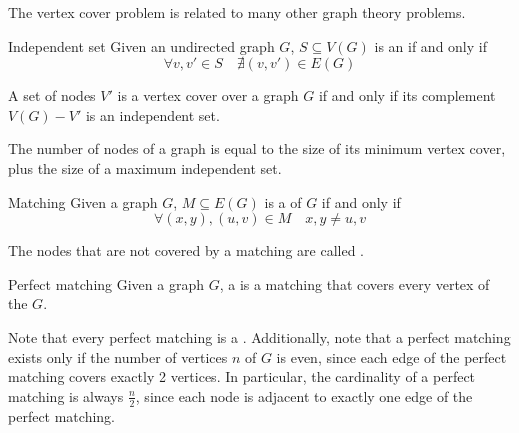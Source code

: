 \documentclass[a4paper, 12pt]{report}
\begin{document}
    The vertex cover problem is related to many other graph theory problems.

    \begin{frameddefn}{Independent set}
        Given an undirected graph $G$, $S \subseteq V(G)$ is an  if and only if $$\forall v, v' \in S \quad \nexists (v, v') \in E(G)$$
    \end{frameddefn}

    \begin{framedthm}{}
        A set of nodes $V'$ is a vertex cover over a graph $G$ if and only if its complement $V(G) - V'$ is an independent set.
    \end{framedthm}


    \begin{framedcor}{}
        The number of nodes of a graph is equal to the size of its minimum vertex cover, plus the size of a maximum independent set.
    \end{framedcor}

    \begin{frameddefn}{Matching}
        Given a graph $G$, $M \subseteq E(G)$ is a  of $G$ if and only if $$\forall (x, y), (u, v) \in M \quad x , y\neq u,v$$
    \end{frameddefn}

    The nodes that are not covered by a matching are called .

    \begin{frameddefn}{Perfect matching}
        Given a graph $G$, a  is a matching that covers every vertex of the $G$.
    \end{frameddefn}

    Note that every perfect matching is a . Additionally, note that a perfect matching exists only if the number of vertices $n$ of $G$ is even, since each edge of the perfect matching covers exactly 2 vertices. In particular, the cardinality of a perfect matching is always $\frac{n}{2}$, since each node is adjacent to exactly one edge of the perfect matching.
\end{document}
